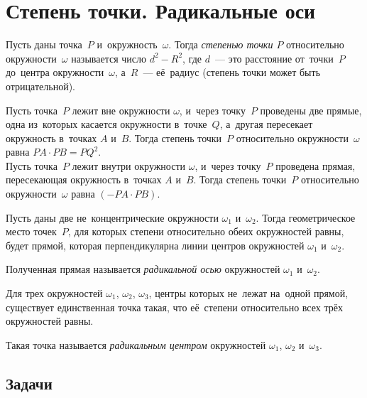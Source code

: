 
\section*{Степень точки. Радикальные оси}

Пусть даны точка~$P$ и~окружность~$\omega$.
Тогда \emph{степенью точки $P$} относительно окружности~$\omega$ называется
число $d^2 - R^2$, где $d$~--- это расстояние от~точки~$P$ до~центра
окружности~$\omega$, а~$R$~--- её~радиус
(степень точки может быть отрицательной).

\setcounter{jeolmsubproblem}{0}
\sp
Пусть точка~$P$ лежит вне окружности $\omega$, и~через точку~$P$ проведены
две прямые, одна из~которых касается окружности в~точке~$Q$, а~другая
пересекает окружность в~точках $A$ и~$B$.
Тогда степень точки~$P$ относительно окружности~$\omega$ равна
$PA \cdot PB = PQ^2$.
\\
\sp
Пусть точка~$P$ лежит внутри окружности $\omega$, и~через точку~$P$ проведена
прямая, пересекающая окружность в~точках $A$ и~$B$.
Тогда степень точки~$P$ относительно окружности~$\omega$ равна
$(- PA \cdot PB)$.

Пусть даны две не~концентрические окружности $\omega_1$ и~$\omega_2$.
Тогда геометрическое место точек~$P$, для которых степени относительно обеих
окружностей равны, будет прямой, которая перпендикулярна линии центров
окружностей $\omega_1$ и~$\omega_2$.

Полученная прямая называется \emph{радикальной осью} окружностей $\omega_1$
и~$\omega_2$.

Для трех окружностей $\omega_1$, $\omega_2$, $\omega_3$, центры которых
не~лежат на~одной прямой, существует единственная точка такая, что её~степени
относительно всех трёх окружностей равны.

Такая точка называется \emph{радикальным центром} окружностей
$\omega_1$, $\omega_2$ и~$\omega_3$.


\subsection*{Задачи}

